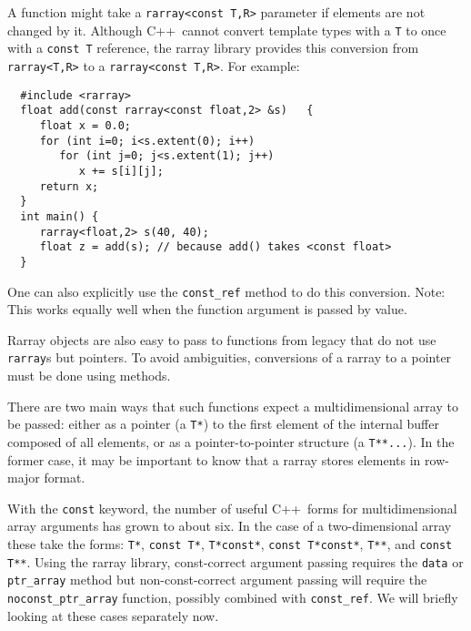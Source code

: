 \documentclass[11pt,twoside]{article}
\newcommand{\cxx}{C{++}}
\begin{document}
A function might take a \texttt{rarray{\tt<}const T,R{\tt>}} parameter
if elements are not changed by it.  Although \cxx\ cannot convert
template types with a \texttt{T} to once with a \texttt{const T}
reference, the rarray library provides this conversion from
\texttt{rarray{\tt<}T,R{\tt>}} to a \texttt{rarray{\tt<}const
  T,R{\tt>}}. For example:
\vspace{-5pt}\begin{framed}\vspace{-14pt}%
\begin{verbatim}
  #include <rarray>
  float add(const rarray<const float,2> &s)   {
     float x = 0.0;
     for (int i=0; i<s.extent(0); i++)
        for (int j=0; j<s.extent(1); j++)
           x += s[i][j];
     return x;
  }
  int main() {
     rarray<float,2> s(40, 40);
     float z = add(s); // because add() takes <const float>
  }
\end{verbatim}%
\vspace{-14pt}
\end{framed}\vspace{-8pt}
One can also explicitly use the \texttt{const\_ref} method to do this conversion.
Note: This works equally well when the function argument is passed by value.

Rarray objects are also easy to pass to functions from legacy that do
not use \texttt{rarray}s but pointers.  To avoid ambiguities, 
conversions of a rarray to a pointer must be done using
methods.

There are two main ways that such functions expect a multidimensional
array to be passed: either as a pointer (a \texttt{T*}) to the first
element of the internal buffer composed of all elements, or as a
pointer-to-pointer structure (a \texttt{T**...}).  In the former case, it may be
important to know that a rarray stores elements in row-major
format.

With the \texttt{const} keyword, the number of useful \cxx\ forms for multidimensional array arguments has grown to about six.  In the case of a two-dimensional array these take the forms:
 \texttt{T*}, \texttt{const T*}, \texttt{T*const*}, \texttt{const T*const*}, \texttt{T**}, and \texttt{const T**}.
Using the rarray library, const-correct argument passing requires the \texttt{data} or \texttt{ptr\_array} method but non-const-correct argument passing will require the \texttt{noconst\_ptr\_array} function, possibly combined with \texttt{const\_ref}.
We will briefly looking at these cases separately now.
\end{document}
